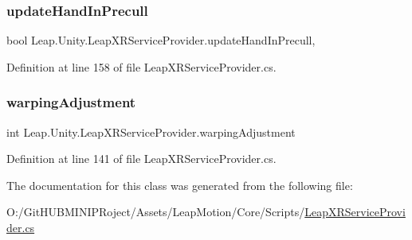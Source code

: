 \mbox{\label{class_leap_1_1_unity_1_1_leap_x_r_service_provider_ae9458c66f5008c4592c6f94453b0b043}} 
\subsubsection{\texorpdfstring{updateHandInPrecull}{updateHandInPrecull}}
{\footnotesize\ttfamily bool Leap.\+Unity.\+Leap\+X\+R\+Service\+Provider.\+update\+Hand\+In\+Precull\hspace{0.3cm}{\ttfamily [get]}, {\ttfamily [set]}}



Definition at line 158 of file Leap\+X\+R\+Service\+Provider.\+cs.

\mbox{\label{class_leap_1_1_unity_1_1_leap_x_r_service_provider_a668f8752cd2db6f77abbd44e89980b79}} 
\subsubsection{\texorpdfstring{warpingAdjustment}{warpingAdjustment}}
{\footnotesize\ttfamily int Leap.\+Unity.\+Leap\+X\+R\+Service\+Provider.\+warping\+Adjustment\hspace{0.3cm}{\ttfamily [get]}}



Definition at line 141 of file Leap\+X\+R\+Service\+Provider.\+cs.



The documentation for this class was generated from the following file\+:\begin{DoxyCompactItemize}
\item 
O\+:/\+Git\+H\+U\+B\+M\+I\+N\+I\+P\+Roject/\+Assets/\+Leap\+Motion/\+Core/\+Scripts/\mbox{\hyperlink{_leap_x_r_service_provider_8cs}{Leap\+X\+R\+Service\+Provider.\+cs}}\end{DoxyCompactItemize}
